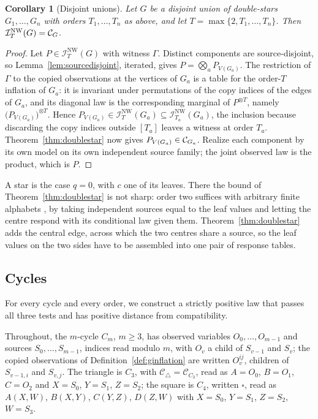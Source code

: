\documentclass[11pt]{article}
\theoremstyle{plain}
\newtheorem{corollary}[theorem]{Corollary}
\theoremstyle{definition}
\newcommand{\Ctri}{\mathcal C_{\triangle}}
\newcommand{\INW}{\mathcal I^{\mathrm{NW}}}
\begin{document}
\begin{corollary}[Disjoint unions]\label{cor:disjointunions}
Let $G$ be a disjoint union of double-stars $G_1,\dots,G_n$ with orders $T_1,\dots,T_n$ as above, and let $T=\max\{2,T_1,\dots,T_n\}$. Then $\INW_T(G)=\Cscen{G}$.
\end{corollary}

\begin{proof}
Let $P\in\INW_T(G)$ with witness $\Gamma$. Distinct components are source-disjoint, so Lemma~\ref{lem:sourcedisjoint}, iterated, gives $P=\bigotimes_aP_{V(G_a)}$. The restriction of $\Gamma$ to the copied observations at the vertices of $G_a$ is a table for the order-$T$ inflation of $G_a$: it is invariant under permutations of the copy indices of the edges of $G_a$, and its diagonal law is the corresponding marginal of $P^{\otimes T}$, namely $\bigl(P_{V(G_a)}\bigr)^{\otimes T}$. Hence $P_{V(G_a)}\in\INW_T(G_a)\subseteq\INW_{T_a}(G_a)$, the inclusion because discarding the copy indices outside $[T_a]$ leaves a witness at order $T_a$. Theorem~\ref{thm:doublestar} now gives $P_{V(G_a)}\in\Cscen{G_a}$. Realize each component by its own model on its own independent source family; the joint observed law is the product, which is $P$.
\end{proof}

A star is the case $q=0$, with $c$ one of its leaves. There the bound of Theorem~\ref{thm:doublestar} is not sharp: order two suffices with arbitrary finite alphabets \cite[Section 4.1]{NW2020}, by taking independent sources equal to the leaf values and letting the centre respond with its conditional law given them. Theorem~\ref{thm:doublestar} adds the central edge, across which the two centres share a source, so the leaf values on the two sides have to be assembled into one pair of response tables.

\providecommand{\Cscen}[1]{\mathcal C_{#1}}
\providecommand{\Csq}{\mathcal C_{\square}}
\providecommand{\Ccyc}{\mathcal C_{C_m}}
\providecommand{\Real}{\operatorname{Re}}
\providecommand{\sgn}{\operatorname{sgn}}

\subsection{Cycles}\label{sec:cycles}

For every cycle and every order, we construct a strictly positive law that passes all three tests and has positive distance from compatibility.

Throughout, the $m$-cycle $C_m$, $m\ge3$, has observed variables $O_0,\dots,O_{m-1}$ and sources $S_0,\dots,S_{m-1}$, indices read modulo $m$, with $O_v$ a child of $S_{v-1}$ and $S_v$; the copied observations of Definition~\ref{def:ginflation} are written $O_v^{ij}$, children of $S_{v-1,i}$ and $S_{v,j}$. The triangle is $C_3$, with $\Ctri=\Cscen{C_3}$, read as $A=O_0$, $B=O_1$, $C=O_2$ and $X=S_0$, $Y=S_1$, $Z=S_2$; the square is $C_4$, written $\square$, read as $A(X,W)$, $B(X,Y)$, $C(Y,Z)$, $D(Z,W)$ with $X=S_0$, $Y=S_1$, $Z=S_2$, $W=S_3$.
\end{document}
